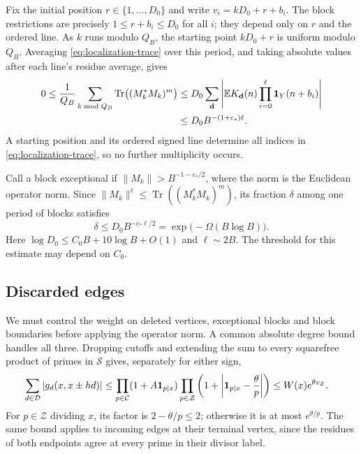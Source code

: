 Fix the initial position $r\in\{1,\ldots,D_0\}$ and write
$v_i=kD_0+r+b_i$. The block restrictions are precisely
$1\le r+b_i\le D_0$ for all $i$; they depend only on $r$ and the
ordered line. As $k$ runs modulo $Q_B$, the starting point $kD_0+r$
is uniform modulo $Q_B$. Averaging \eqref{eq:localization-trace} over
this period, and taking absolute values after each line's residue
average, gives
\begin{align}
 0\le\frac1{Q_B}\sum_{k\bmod Q_B}
 \operatorname{Tr}\bigl((M_k^*M_k)^m\bigr)
 &\le D_0\sum_{\mathbf d}
       \left|\mathbb E K_{\mathbf d}(n)
             \prod_{i=0}^{\ell}\mathbf 1_Y(n+b_i)\right|\notag\\
 &\le D_0 B^{-(1+c_*)\ell}.\label{eq:localization-moment}
\end{align}
A starting position and its ordered signed line determine all indices
in \eqref{eq:localization-trace}, so no further multiplicity occurs.

Call a block exceptional if
$\|M_k\|>B^{-1-c_*/2}$, where the norm is the Euclidean operator norm.
Since $\|M_k\|^\ell\le\operatorname{Tr}((M_k^*M_k)^m)$, its fraction
$\delta$ among one period of blocks satisfies
\begin{equation}\label{eq:exceptional-blocks}
 \delta\le D_0B^{-c_*\ell/2}
       =\exp\bigl(-\Omega(B\log B)\bigr).
\end{equation}
Here $\log D_0\le C_0B+10\log B+O(1)$ and $\ell\sim2B$.
The threshold for this estimate may depend on $C_0$.

\subsection{Discarded edges}

We must control the weight on deleted vertices, exceptional blocks and
block boundaries before applying the operator norm. A common absolute
degree bound handles all three. Dropping cutoffs and extending the
sum to every squarefree product of primes in $\mathcal S$ gives,
separately for either sign,
\begin{align}
 \sum_{d\in\mathcal D}|g_d(x,x\pm hd)|
 &\le\prod_{p\in\mathcal C}(1+A\mathbf 1_{p\mid x})
    \prod_{p\in\mathcal Z}
       \left(1+\left|\mathbf 1_{p\mid x}-\frac\theta p\right|\right)
 \le W(x)e^{\theta v_Z}.\label{eq:absolute-degree}
\end{align}
For $p\in\mathcal Z$ dividing $x$, its factor is $2-\theta/p\le2$;
otherwise it is at most $e^{\theta/p}$. The same bound applies to
incoming edges at their terminal vertex, since the residues of both
endpoints agree at every prime in their divisor label.

